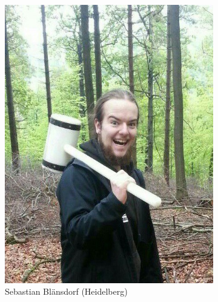 \documentclass[compress, aspectratio=169]{beamer}
\begin{document}
\begin{frame}
\begin{figure}
\begin{subfigure}[t]{0.24\textwidth}
                \includegraphics[height=0.5\textheight]{blaensdorf.jpg}
                \caption*{Sebastian Blänsdorf (Heidelberg)}
        \end{subfigure}
            \begin{subfigure}[t]{0.24\textwidth}

\end{subfigure}
\end{figure}
\end{frame}
\end{document}
